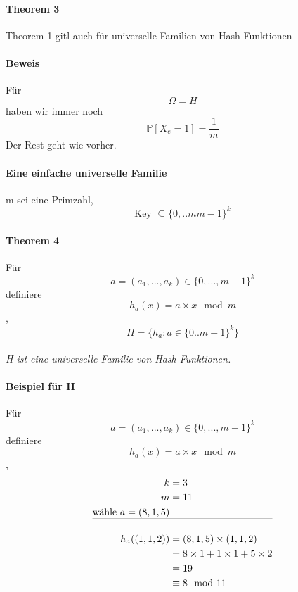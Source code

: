 \documentclass[a4paper]{scrartcl}
\begin{document}
	 	\paragraph{Theorem 3}
	 	Theorem 1 gitl auch für universelle Familien von Hash-Funktionen
	 	
	 	\paragraph{Beweis}
	 	Für \[ \Omega = H \]
	 	haben wir immer noch 
	 	\[ \mathbb{P}[X_e = 1] = \frac{1}{m} \]
	 	Der Rest geht wie vorher.
	 	
		 \paragraph{Eine einfache universelle Familie}
		 m sei eine Primzahl, 
		 \[ \text{Key } \subseteq \{ 0,..m m - 1 \}^k  \]
		 
		 \paragraph{Theorem 4}
		 Für \[ a = (a_1,..., a_k) \in \{0,..., m-1\}^k  \]
		 definiere \[h_a(x) = a \times x \mod m \],
		 \[ H = \{h_a : a \in \{ 0.. m-1 \}^k \} \]\\
		 \emph{H ist eine universelle Familie von Hash-Funktionen.}
		 
		 \paragraph{Beispiel für H}
		 Für \[ a = (a_1,..., a_k) \in \{0,..., m-1\}^k  \]
		 definiere \[h_a(x) = a \times x \mod m \],
		 \begin{align*}
		 	k &= 3\\
		 	m &= 11 \\
		 	\text{wähle } a = (8, 1, 5)\\ \hline
		 	\\
		 	h_a ((1, 1, 2)) &= (8, 1, 5) \times (1, 1, 2)\\
		 	&= 8 \times 1 + 1 \times 1+5 \times 2\\
		 	&=19\\
		 	&\equiv 8 \mod 11\\
		 \end{align*}
		 
\end{document}
